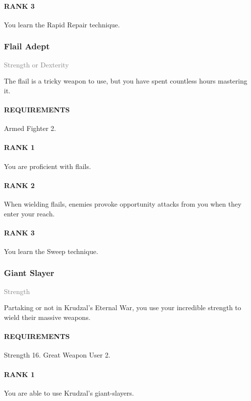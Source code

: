 \paragraph{RANK 3} You learn the Rapid Repair technique.

\subsubsection{Flail Adept} \label{feat::flailadept}
\small{\textcolor{gray}{Strength or Dexterity}}

\normalsize
The flail is a tricky weapon to use, but you have spent countless hours mastering it.
\paragraph{REQUIREMENTS} Armed Fighter 2.
\paragraph{RANK 1} You are proficient with flails.
\paragraph{RANK 2} When wielding flails, enemies provoke opportunity attacks from you when they enter your reach.
\paragraph{RANK 3} You learn the Sweep technique.

\subsubsection{Giant Slayer} \label{feat::giantslayer}
\small{\textcolor{gray}{Strength}}

\normalsize
Partaking or not in Krudzal's Eternal War, you use your incredible strength to wield their massive weapons.
\paragraph{REQUIREMENTS} Strength 16. Great Weapon User 2.
\paragraph{RANK 1} You are able to use Krudzal's giant-slayers.
